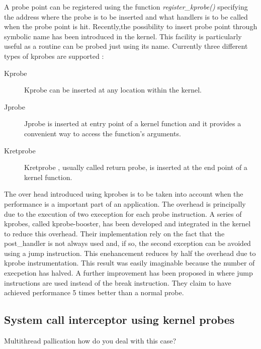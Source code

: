 \par
A probe point can be registered using the function \textit{register\_kprobe()} specifying the address where the probe is to be inserted and what  handlers is to be called when the probe point is hit. Recently,the possibility to insert probe point through symbolic name has been introduced in the kernel. This facility is particularly useful as a routine can be probed just using its name.
Currently three different types of kprobes are supported : 

\begin{description}
\item[Kprobe] Kprobe can be inserted at any location within the kernel. 
\item[Jprobe] Jprobe is inserted at entry point of a kernel function and it provides a  convenient way to access the function's arguments. 
\item[Kretprobe] Kretprobe , usually called return probe, is inserted at the end point of a kernel function.  
\end{description}
The over head introduced using kprobes is to be taken into account when the performance is a important part of an application. The overhead is principally due to the execution of two exeception for each probe instruction. A series of kprobes, called kprobe-booster, has been developed and integrated in the kernel to reduce this overhead. Their implementation rely on the fact that the post\_handler is not always used and, if so,  the second exception can be avoided using a jump instruction. This enehancement reduces by half the overhead due to kprobe instrumentation. This result was easily imaginable because the number of execpetion has halved. A further improvement has been proposed in \citep{Djprobe:2007} where jump instructions are used instead of the break instruction. They claim to have achieved performance 5 times better than a normal probe.   

\subsection{System call interceptor using kernel probes}
Multithread pallication 
how do you deal with this case?
